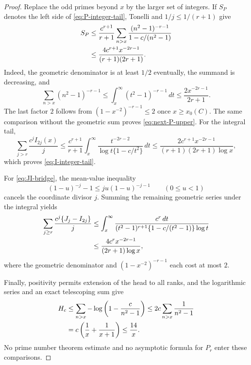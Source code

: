 \documentclass[11pt]{article}
\theoremstyle{definition}
\theoremstyle{remark}
\begin{document}
\begin{proof}
Replace the odd primes beyond $x$ by the larger set of integers.  If
$S_P$ denotes the left side of \eqref{eq:P-integer-tail}, Tonelli and
$1/j\le1/(r+1)$ give
\begin{align}
 S_P
 &\le\frac{c^{r+1}}{r+1}\sum_{n>x}
 \frac{(n^2-1)^{-r-1}}{1-c/(n^2-1)} \notag\\
 &\le\frac{4c^{r+1}x^{-2r-1}}{(r+1)(2r+1)}.
 \label{eq:SP-payment}
\end{align}
Indeed, the geometric denominator is at least $1/2$ eventually, the
summand is decreasing, and
\begin{equation}
 \sum_{n>x}(n^2-1)^{-r-1}
 \le\int_x^\infty(t^2-1)^{-r-1}\,dt
 \le\frac{2x^{-2r-1}}{2r+1}.
 \label{eq:integer-payment}
\end{equation}
The last factor $2$ follows from
$(1-x^{-2})^{-r-1}\le2$ once $x\ge x_0(C)$.  The same comparison without
the geometric sum proves \eqref{eq:next-P-upper}.  For the integral tail,
\begin{equation}
 \sum_{j>r}\frac{c^jI_{2j}(x)}j
 \le\frac{c^{r+1}}{r+1}\int_x^\infty
 \frac{t^{-2r-2}}{\log t\{1-c/t^2\}}\,dt
 \le\frac{2c^{r+1}x^{-2r-1}}
 {(r+1)(2r+1)\log x},
 \label{eq:SI-payment}
\end{equation}
which proves \eqref{eq:I-integer-tail}.

For \eqref{eq:JI-bridge}, the mean-value inequality
\[
 (1-u)^{-j}-1\le ju(1-u)^{-j-1}\qquad(0\le u<1)
\]
cancels the coordinate divisor $j$.  Summing the remaining geometric
series under the integral yields
\begin{align}
 \sum_{j\ge r}\frac{c^j\{J_j-I_{2j}\}}j
 &\le\int_x^\infty\frac{c^r\,dt}
 {(t^2-1)^{r+1}\{1-c/(t^2-1)\}\log t} \notag\\
 &\le\frac{4c^rx^{-2r-1}}{(2r+1)\log x},
 \label{eq:JI-payment}
\end{align}
where the geometric denominator and
$(1-x^{-2})^{-r-1}$ each cost at most $2$.

Finally, positivity permits extension of the head to all ranks, and
the logarithmic series and an exact telescoping sum give
\begin{align}
 H_c
 &\le\sum_{n>x}-\log\left(1-\frac{c}{n^2-1}\right)
 \le2c\sum_{n>x}\frac1{n^2-1} \notag\\
 &=c\left(\frac1x+\frac1{x+1}\right)\le\frac{14}{x}.
 \label{eq:H-payment}
\end{align}
No prime number theorem estimate and no asymptotic formula for $P_r$
enter these comparisons.
\end{proof}
\end{document}
